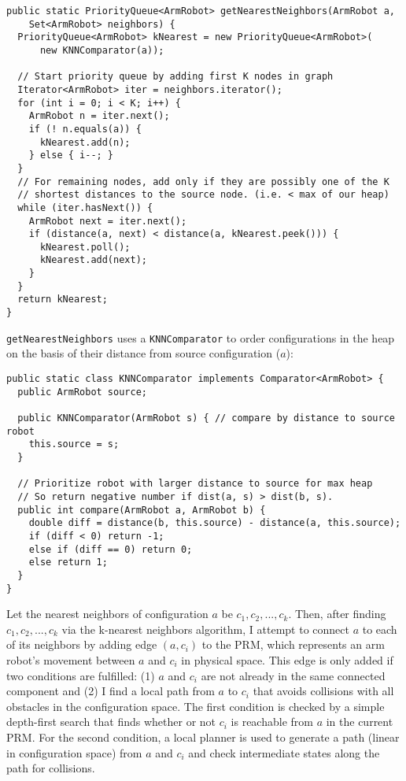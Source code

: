 \documentclass{article}
\begin{document}
\vspace{10mm}

\begin{lstlisting}
public static PriorityQueue<ArmRobot> getNearestNeighbors(ArmRobot a, 
    Set<ArmRobot> neighbors) {
  PriorityQueue<ArmRobot> kNearest = new PriorityQueue<ArmRobot>(
      new KNNComparator(a));
  
  // Start priority queue by adding first K nodes in graph
  Iterator<ArmRobot> iter = neighbors.iterator();      
  for (int i = 0; i < K; i++) {
    ArmRobot n = iter.next();
    if (! n.equals(a)) {
      kNearest.add(n);
    } else { i--; }
  }
  // For remaining nodes, add only if they are possibly one of the K
  // shortest distances to the source node. (i.e. < max of our heap)
  while (iter.hasNext()) {
    ArmRobot next = iter.next();
    if (distance(a, next) < distance(a, kNearest.peek())) {
      kNearest.poll();
      kNearest.add(next);
    }
  }
  return kNearest;
}
\end{lstlisting}

\vspace{10mm}

\verb`getNearestNeighbors` uses a \verb`KNNComparator` to order configurations in the heap on the basis of their distance from source configuration ($a$):

\begin{lstlisting}
public static class KNNComparator implements Comparator<ArmRobot> {
  public ArmRobot source;
  
  public KNNComparator(ArmRobot s) { // compare by distance to source robot
    this.source = s;
  }
  
  // Prioritize robot with larger distance to source for max heap
  // So return negative number if dist(a, s) > dist(b, s).
  public int compare(ArmRobot a, ArmRobot b) {
    double diff = distance(b, this.source) - distance(a, this.source);
    if (diff < 0) return -1;
    else if (diff == 0) return 0;
    else return 1;
  }  
}
\end{lstlisting}

Let the nearest neighbors of configuration $a$ be ${c_1, c_2, ..., c_k}$. Then, after finding ${c_1, c_2, ..., c_k}$ via the k-nearest neighbors algorithm, I attempt to connect $a$ to each of its neighbors by adding edge $(a, c_i)$ to the PRM, which represents an arm robot's movement between $a$ and $c_i$ in physical space. This edge is only added if two conditions are fulfilled: (1) $a$ and $c_i$ are not already in the same connected component and (2) I find a local path from $a$ to $c_i$ that avoids collisions with all obstacles in the configuration space. The first condition is checked by a simple depth-first search that finds whether or not $c_i$ is reachable from $a$ in the current PRM. For the second condition, a local planner is used to generate a path (linear in configuration space) from $a$ and $c_i$ and check intermediate states along the path for collisions.
\end{document}
